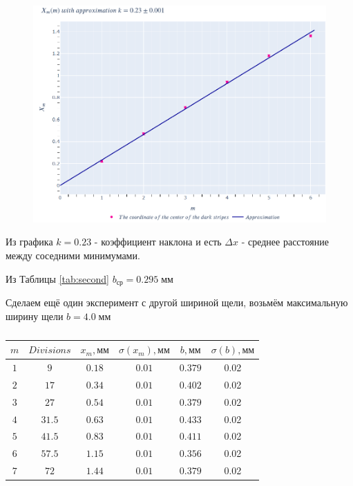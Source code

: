 \documentclass[a4paper, 12pt]{article}
\begin{document}
\begin{figure}[H]
\includegraphics[scale=0.9]{Fraunhofer.png}
\end{figure}

Из графика  $k = 0.23$ - коэффициент наклона и есть $\Delta x$ - среднее расстояние между соседними минимумами.

Из Таблицы \ref{tab:second} $b_{\text{ср}} = 0.295\; \text{мм}$ 

Сделаем ещё один эксперимент с другой шириной щели, возьмём максимальную ширину щели $b = 4.0\; \text{мм}$

\begin{table}[H]
\begin{center}
\begin{tabular}{|c|c|c|c|c|c|}\hline
$m$ & $Divisions$ & $x_m, \text{мм}$ & $\sigma(x_m), \text{мм}$ & $b, \text{мм}$ & $\sigma(b), \text{мм}$\\\hline
$1$ & $9$  & $0.18$ & $0.01$ & $ 0.379$ & 0.02\\\hline
$2$ & $17$ & $0.34$ & $0.01$ & $0.402$ & 0.02\\\hline
$3$ & $27$ & $0.54$ & $0.01$ & $0.379$ & 0.02\\\hline
$4$ & $31.5$ & $0.63$ & $0.01$ & $0.433$ & 0.02\\\hline
$5$ & $41.5$ & $0.83$ & $0.01$ & $0.411$ & 0.02\\\hline
$6$ & $57.5$ & $1.15$ & $0.01$ & $0.356$ & 0.02\\\hline
$7$ & $72$ & $1.44$ & $0.01$ & $0.379$ & 0.02\\\hline
\end{tabular}\\~\\
\end{center}
\caption{\label{tab:third}}
\end{table}
\end{document}

